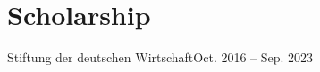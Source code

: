 \section{Scholarship}

\resumeSubHeadingListStart

\resumeSubSubheading
{Stiftung der deutschen Wirtschaft}{Oct. 2016 -- Sep. 2023}

\resumeItemListStart
{}
\resumeItemListEnd

\resumeSubHeadingListEnd
